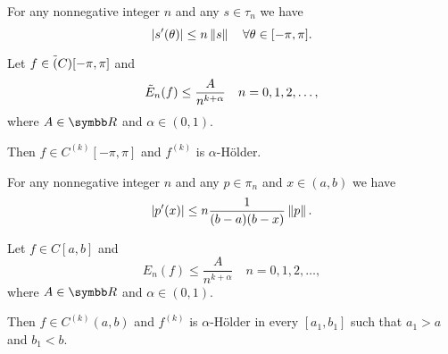 \begin{Theorem}\label{thm:bernsteins_trigonometric_inequality}\cite[53]{Николов2020}
  For any nonnegative integer \( n \) and any \( s \in \tau_n \) we have
  \begin{equation*}
    \left\vert s'(\theta) \right\vert \leq n \left\Vert s \right\Vert \quad\forall \theta \in [-\pi, \pi].
  \end{equation*}
\end{Theorem}

\begin{Theorem}\label{thm:bernsteins_trigonometric_theorem}\cite[55]{Николов2020}
  Let \( f \in \tilde{(}C)[-\pi, \pi] \) and
  \begin{equation*}
    \tilde{E}_n(f) \leq \frac A {n^{k+\alpha}} \quad n = 0, 1, 2, \ldots,
  \end{equation*}
  where \( A \in \BR \) and \( \alpha \in (0, 1) \).

  Then \( f \in C^{(k)}[-\pi, \pi] \) and \( f^{(k)} \) is \( \alpha \)-H\"older.
\end{Theorem}

\begin{Theorem}\label{thm:bernsteins_algebraic_inequality}\cite[59]{Николов2020}
  For any nonnegative integer \( n \) and any \( p \in \pi_n \) and \( x \in (a, b) \) we have
  \begin{equation*}
    \left\vert p'(x) \right\vert \leq n \frac 1 {(b - a)(b - x)} \left\Vert p \right\Vert.
  \end{equation*}
\end{Theorem}

\begin{Theorem}\label{thm:bernsteins_algebraic_theorem}\cite[60]{Николов2020}
  Let \( f \in C[a, b] \) and
  \begin{equation*}
    E_n(f) \leq \frac A {n^{k+\alpha}} \quad n = 0, 1, 2, \ldots,
  \end{equation*}
  where \( A \in \BR \) and \( \alpha \in (0, 1) \).

  Then \( f \in C^{(k)}(a, b) \) and \( f^{(k)} \) is \( \alpha \)-H\"older in every \( [a_1, b_1] \) such that \( a_1 > a \) and \( b_1 < b \).
\end{Theorem}
